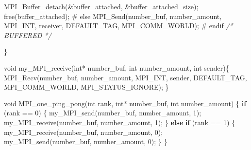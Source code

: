\documentclass[11pt]{article}
\newenvironment{Shaded}{}{}
\newcommand{\DataTypeTok}[1]{\textcolor[rgb]{0.56,0.13,0.00}{{#1}}}
\newcommand{\DecValTok}[1]{\textcolor[rgb]{0.25,0.63,0.44}{{#1}}}
\newcommand{\CommentTok}[1]{\textcolor[rgb]{0.38,0.63,0.69}{\textit{{#1}}}}
\newcommand{\NormalTok}[1]{{#1}}
\newcommand{\ControlFlowTok}[1]{\textcolor[rgb]{0.00,0.44,0.13}{\textbf{{#1}}}}
\newcommand{\OperatorTok}[1]{\textcolor[rgb]{0.40,0.40,0.40}{{#1}}}
\newcommand{\PreprocessorTok}[1]{\textcolor[rgb]{0.74,0.48,0.00}{{#1}}}
\begin{document}
\begin{Shaded}
\begin{Highlighting}[]
\NormalTok{        MPI\_Buffer\_detach}\OperatorTok{(\&}\NormalTok{buffer\_attached}\OperatorTok{,} \OperatorTok{\&}\NormalTok{buffer\_attached\_size}\OperatorTok{);}
\NormalTok{        free}\OperatorTok{(}\NormalTok{buffer\_attached}\OperatorTok{);} 
  \PreprocessorTok{\# else}
\NormalTok{      MPI\_Send}\OperatorTok{(}\NormalTok{number\_buf}\OperatorTok{,}\NormalTok{ number\_amount}\OperatorTok{,}\NormalTok{ MPI\_INT}\OperatorTok{,}\NormalTok{ receiver}\OperatorTok{,}\NormalTok{ DEFAULT\_TAG}\OperatorTok{,}\NormalTok{ MPI\_COMM\_WORLD}\OperatorTok{);}
  \PreprocessorTok{\# endif }\CommentTok{/* BUFFERED */}

\OperatorTok{\}}


\DataTypeTok{void}\NormalTok{ my\_MPI\_receive}\OperatorTok{(}\DataTypeTok{int}\OperatorTok{*}\NormalTok{ number\_buf}\OperatorTok{,} \DataTypeTok{int}\NormalTok{ number\_amount}\OperatorTok{,} \DataTypeTok{int}\NormalTok{ sender}\OperatorTok{)\{}
\NormalTok{  MPI\_Recv}\OperatorTok{(}\NormalTok{number\_buf}\OperatorTok{,}\NormalTok{ number\_amount}\OperatorTok{,}\NormalTok{ MPI\_INT}\OperatorTok{,}\NormalTok{ sender}\OperatorTok{,}\NormalTok{ DEFAULT\_TAG}\OperatorTok{,}\NormalTok{ MPI\_COMM\_WORLD}\OperatorTok{,}\NormalTok{ MPI\_STATUS\_IGNORE}\OperatorTok{);}
\OperatorTok{\}}

\DataTypeTok{void}\NormalTok{ MPI\_one\_ping\_pong}\OperatorTok{(}\DataTypeTok{int}\NormalTok{ rank}\OperatorTok{,} \DataTypeTok{int}\OperatorTok{*}\NormalTok{ number\_buf}\OperatorTok{,} \DataTypeTok{int}\NormalTok{ number\_amount}\OperatorTok{)} \OperatorTok{\{}
  \ControlFlowTok{if} \OperatorTok{(}\NormalTok{rank }\OperatorTok{==} \DecValTok{0}\OperatorTok{)} \OperatorTok{\{}
\NormalTok{    my\_MPI\_send}\OperatorTok{(}\NormalTok{number\_buf}\OperatorTok{,}\NormalTok{ number\_amount}\OperatorTok{,} \DecValTok{1}\OperatorTok{);}
\NormalTok{        my\_MPI\_receive}\OperatorTok{(}\NormalTok{number\_buf}\OperatorTok{,}\NormalTok{ number\_amount}\OperatorTok{,} \DecValTok{1}\OperatorTok{);}
  \OperatorTok{\}} \ControlFlowTok{else} \ControlFlowTok{if} \OperatorTok{(}\NormalTok{rank }\OperatorTok{==} \DecValTok{1}\OperatorTok{)} \OperatorTok{\{}
\NormalTok{        my\_MPI\_receive}\OperatorTok{(}\NormalTok{number\_buf}\OperatorTok{,}\NormalTok{ number\_amount}\OperatorTok{,} \DecValTok{0}\OperatorTok{);} 
\NormalTok{    my\_MPI\_send}\OperatorTok{(}\NormalTok{number\_buf}\OperatorTok{,}\NormalTok{ number\_amount}\OperatorTok{,} \DecValTok{0}\OperatorTok{);}
  \OperatorTok{\}}
\OperatorTok{\}}


\end{Highlighting}
\end{Shaded}
\end{document}

